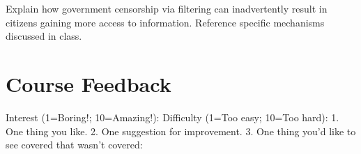Explain how government censorship via filtering can inadvertently result in
citizens gaining more access to information. Reference specific mechanisms
discussed in class. \\
\eprob

\section*{Course Feedback}
\vspace*{-0.1in}
Interest (1=Boring!; 10=Amazing!):
Difficulty (1=Too easy; 10=Too hard):
\eprob
{}
1. One thing you like. 2. One suggestion for improvement. 3. One thing you'd
like to see covered that wasn't covered:

\eprob


